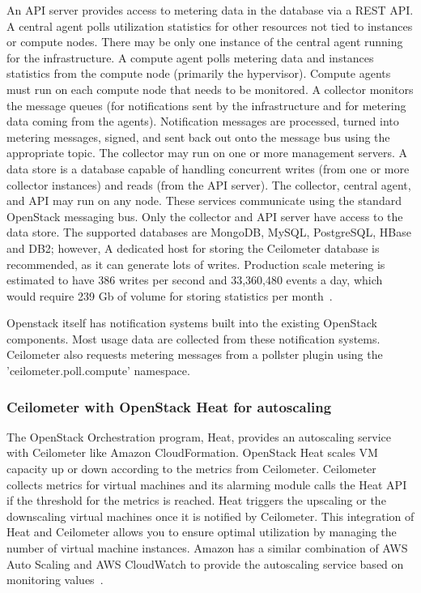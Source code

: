 \documentclass{sig-alternate}
\begin{document}
An API server provides access to metering data in the database via a REST API. A central agent polls utilization statistics for other resources not tied to instances or compute nodes. There may be only one instance of the central agent running for the infrastructure. A compute agent polls metering data and instances statistics from the compute node (primarily the hypervisor). Compute agents must run on each compute node that needs to be monitored. A collector monitors the message queues (for notifications sent by the infrastructure and for metering data coming from the agents). Notification messages are processed, turned into metering messages, signed, and sent back out onto the message bus using the appropriate topic. The collector may run on one or more management servers. A data store is a database capable of handling concurrent writes (from one or more collector instances) and reads (from the API server). The collector, central agent, and API may run on any node. These services communicate using the standard OpenStack messaging bus. Only the collector and API server have access to the data store. The supported databases are MongoDB, MySQL, PostgreSQL, HBase and DB2; however, A dedicated host for storing the Ceilometer database is recommended, as it can generate lots of writes. Production scale metering is estimated to have 386 writes per second and 33,360,480 events a day, which would require 239 Gb of volume for storing statistics per month~\cite{Barcet12}.

Openstack itself has notification systems built into the existing OpenStack components. Most usage data are collected from these notification systems. Ceilometer also requests metering messages from a pollster plugin using the 'ceilometer.poll.compute' namespace.

\subsubsection{Ceilometer with OpenStack Heat for autoscaling}

The OpenStack Orchestration program, Heat, provides an autoscaling service with Ceilometer like Amazon CloudFormation. OpenStack Heat scales VM capacity up or down according to the metrics from Ceilometer. Ceilometer collects metrics for virtual machines and its alarming module calls the Heat API if the threshold for the metrics is reached. Heat triggers the upscaling or the downscaling virtual machines once it is notified by Ceilometer. This integration of Heat and Ceilometer allows you to ensure optimal utilization by managing the number of virtual machine instances. Amazon has a similar combination of AWS Auto Scaling and AWS CloudWatch to provide the autoscaling service based on monitoring values~\cite{Abaakouk13}.
\end{document}
